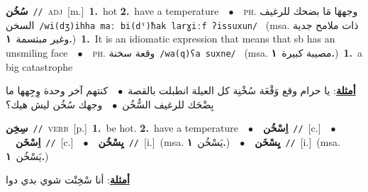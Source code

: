 \documentclass[10pt,a4paper,twoside]{article} %
\begin{document}
\begin{multicols}{2}
{\setlength\topsep{0pt}\textbf{\foreignlanguage{arabic}{سُخُن}}\ {\color{gray}\texttt{//}\color{black}}\ \textsc{adj}\ [m.]\ \textbf{1.}~hot  \textbf{2.}~have a temperature\ \ $\bullet$\ \ \textsc{ph.} \color{gray} \foreignlanguage{arabic}{وجههَا مَا بضحك للرغيف السخن}\color{black}\ {\color{gray}\texttt{/{\sffamily wi(dʒ)ihha maː bi(dˤ)ħak larɣiːf ʔissuxun}/}\color{black}}\ \color{gray} (msa. \foreignlanguage{arabic}{ذات ملامح جدية وغير مبتسمة}~\foreignlanguage{arabic}{\textbf{١.}})\color{black}\ \textbf{1.}~It is an idiomatic expression that means that sb has an unsmiling face\ \ $\bullet$\ \ \textsc{ph.} \color{gray} \foreignlanguage{arabic}{وقعة سخنة}\color{black}\ {\color{gray}\texttt{/{\sffamily wa(q)ʕa suxne}/}\color{black}}\ \color{gray} (msa. \foreignlanguage{arabic}{مصيبة كبيرة}~\foreignlanguage{arabic}{\textbf{١.}})\color{black}\ \textbf{1.}~a big catastrophe\  \begin{flushright}\color{gray}\foreignlanguage{arabic}{\textbf{\underline{\foreignlanguage{arabic}{أمثلة}}}: يا حرام وقع وَقْعَة سُخْنِة كل العيلة انطبلت بالقصة\ $\bullet$\ \  كنتهم آخر وحدة وِجِهها ما بِضْحَك للرغيف السُّخُن\ $\bullet$\ \  وجهك سُخُن ليش هيك؟}\end{flushright}\color{black}} \vspace{2mm}

{\setlength\topsep{0pt}\textbf{\foreignlanguage{arabic}{سِخِن}}\ {\color{gray}\texttt{//}\color{black}}\ \textsc{verb}\ [p.]\ \textbf{1.}~be hot.  \textbf{2.}~have a temperature\ \ $\bullet$\ \ \setlength\topsep{0pt}\textbf{\foreignlanguage{arabic}{اِسْخُن}}\ {\color{gray}\texttt{//}\color{black}}\ [c.]\ \ $\bullet$\ \ \setlength\topsep{0pt}\textbf{\foreignlanguage{arabic}{اِسْخَن}}\ {\color{gray}\texttt{//}\color{black}}\ [c.]\ \ $\bullet$\ \ \setlength\topsep{0pt}\textbf{\foreignlanguage{arabic}{يِسْخُن}}\ {\color{gray}\texttt{//}\color{black}}\ [i.]\ \color{gray}(msa. \foreignlanguage{arabic}{يَسْخُن}~\foreignlanguage{arabic}{\textbf{١.}})\color{black}\ \ $\bullet$\ \ \setlength\topsep{0pt}\textbf{\foreignlanguage{arabic}{يِسْخَن}}\ {\color{gray}\texttt{//}\color{black}}\ [i.]\ \color{gray}(msa. \foreignlanguage{arabic}{يَسْخُن}~\foreignlanguage{arabic}{\textbf{١.}})\color{black}\  \begin{flushright}\color{gray}\foreignlanguage{arabic}{\textbf{\underline{\foreignlanguage{arabic}{أمثلة}}}: أنا سْخِنْت شوي بدي دوا}\end{flushright}\color{black}} \vspace{2mm}


\end{multicols}
\end{document}
